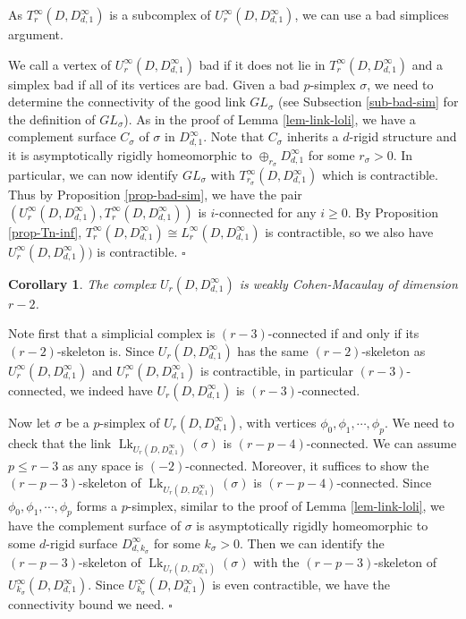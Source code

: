 \documentclass[11pt, a4paper]{amsart}
\newtheorem{cor}[thm]{Corollary}
\theoremstyle{definition}
\DeclareMathOperator{\Lk}{Lk}
\def\Proof{\noindent{\bf Proof.}\quad}
\def\qed{\hfill$\square$\smallskip}
\begin{document}
\Proof As $T_r^{\infty}(D,D^{\infty}_{d,1})$ is a subcomplex of $U_r^{\infty}(D,D^{\infty}_{d,1})$, we can use a bad simplices argument. 

We call a vertex of $U_r^{\infty}(D,D^{\infty}_{d,1})$ bad if it does not lie in $T_r^{\infty}(D,D^{\infty}_{d,1})$ and a simplex bad if all of its vertices are bad.  Given a bad $p$-simplex $\sigma$, we need to determine the connectivity of the good link $GL_{\sigma}$ (see Subsection \ref{sub-bad-sim} for the definition of $GL_\sigma$).   As in the proof of Lemma \ref{lem-link-loli}, we have a complement surface $C_\sigma$ of $\sigma$ in $D^{\infty}_{d,1}$. Note that $C_\sigma$ inherits a $d$-rigid structure and  it is asymptotically rigidly homeomorphic to $\oplus_{r_\sigma}D^{\infty}_{d,1} $ for some $r_\sigma>0$.  In particular, we can now identify $GL_\sigma$ with $T_{r_\sigma}^{\infty}(D,D^{\infty}_{d,1})$ which is contractible. Thus by Proposition \ref{prop-bad-sim}, we have the pair $(U_r^{\infty}(D,D^{\infty}_{d,1}),T_r^{\infty}(D,D^{\infty}_{d,1}))$ is $i$-connected for any $i\geq 0$. By Proposition \ref{prop-Tn-inf}, $T_r^{\infty}(D,D^{\infty}_{d,1}) \cong L_r^{\infty}(D,D^{\infty}_{d,1})$ is contractible, so we also have $U_r^{\infty}(D,D^{\infty}_{d,1}))$ is contractible.
\qed


\begin{cor}\label{cor-conn-Ur}
The complex $U_r(D,D^{\infty}_{d,1})$ is weakly Cohen-Macaulay of dimension $r-2$.
\end{cor}

\Proof 
Note first that a simplicial complex is $(r-3)$-connected if and only if its $(r-2)$-skeleton is. Since $U_r(D,D^{\infty}_{d,1})$ has the same $(r-2)$-skeleton as $U_r^{\infty}(D,D^{\infty}_{d,1})$ and $U_r^{\infty}(D,D^{\infty}_{d,1})$ is contractible, in particular $(r-3)$-connected, we indeed have $U_r(D,D^{\infty}_{d,1})$ is $(r-3)$-connected.  

Now let $\sigma$ be a $p$-simplex of $U_r(D,D^{\infty}_{d,1})$, with vertices $\phi_0,\phi_1,\cdots,\phi_p$. We need to check that the link  $\Lk_ {U_r(D,D^{\infty}_{d,1})}(\sigma)$ is $(r-p-4)$-connected. We can assume $p\leq r-3$ as any space is $(-2)$-connected. Moreover, it suffices to show the $(r-p-3)$-skeleton of $\Lk_{ U_r(D,D^{\infty}_{d,1})}(\sigma)$ is $(r-p-4)$-connected. Since $\phi_0,\phi_1,\cdots,\phi_p$ forms a $p$-simplex, similar to the proof of Lemma \ref{lem-link-loli}, we have the complement surface of $\sigma$ is asymptotically rigidly homeomorphic to some $d$-rigid surface $D^{\infty}_{d,k_\sigma}$ for some $k_\sigma>0$. Then  we can identify the  $(r-p-3)$-skeleton of $\Lk_{U_r(D,D^{\infty}_{d,1})}(\sigma)$ with the  $(r-p-3)$-skeleton of $U_{k_{\sigma}}^{\infty}(D,D^{\infty}_{d,1})$. Since  $U_{k_\sigma}^{\infty}(D,D^{\infty}_{d,1})$ is even contractible, we have the connectivity bound we need.
\qed
\end{document}
